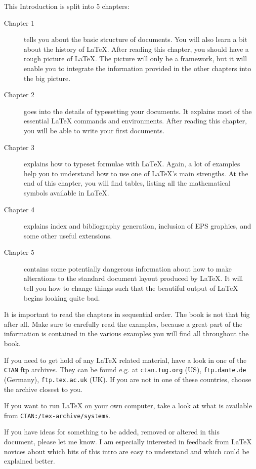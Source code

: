 \noindent This Introduction is split into 5 chapters:
\begin{description}
\item[Chapter 1] tells you about the basic structure of \LaTeXe{}
  documents. You will also learn a bit about the history of \LaTeX{}.
  After reading this chapter, you should have a rough picture of
  \LaTeX{}. The picture will only be a framework, but it will enable
  you to integrate the information provided in the other chapters into
  the big picture.
\item[Chapter 2] goes into the details of typesetting your
  documents. It explains most of the essential \LaTeX{} commands and
  environments. After reading this chapter, you will be able to write
  your first documents. 
\item[Chapter 3] explains how to typeset formulae with \LaTeX. Again, a
  lot of examples help you to understand how to use one of \LaTeX{}'s
  main strengths. At the end of this chapter, you will find tables, listing
  all the mathematical symbols available in \LaTeX{}.
\item[Chapter 4] explains index and  bibliography generation,
  inclusion of EPS graphics, and some other useful extensions.
\item[Chapter 5] contains some potentially dangerous information about
  how to make alterations to the
  standard document layout produced by \LaTeX{}. It will tell you how  to
  change things such that the beautiful output of \LaTeX{}
  begins looking quite bad.
\end{description}
\bigskip
It is important to read the chapters in sequential order. The book is
not that big after all. Make sure to carefully read the examples,
because a great part of the information is contained in the various
examples you will find all throughout the book.

\bigskip
\noindent If you need to get hold of any \LaTeX{} related material, 
have a look in one of the \texttt{CTAN} ftp archives. They can be
found e.g.{} at \texttt{ctan.tug.org} (US), \texttt{ftp.dante.de} (Germany), \texttt{ftp.tex.ac.uk}
(UK). If you are not in one of these countries, choose the archive
closest to you.

If you want to run \LaTeX{} on your own computer, take a look at what
is available from \texttt{CTAN:/tex-archive/systems}.

\noindent If you have ideas for something to be
added, removed or altered in this document, please let me know. I am
especially interested in feedback from \LaTeX{} novices about which
bits of this intro are easy to understand and which could be explained
better.

